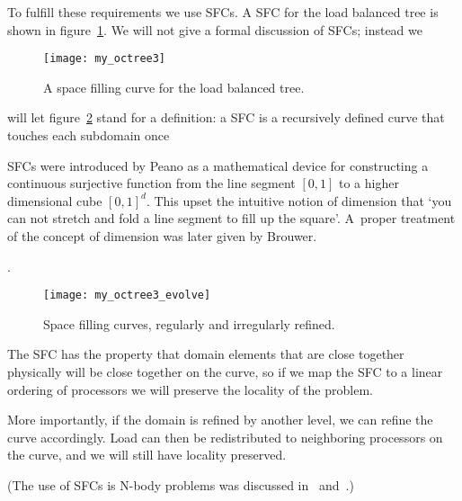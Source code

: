 To fulfill these requirements we use \acfp{SFC}. A \acf{SFC} for the
load balanced tree is shown in figure~\ref{fig:octree-sfc}. We will
not give a formal discussion of \acp{SFC}; instead we
\begin{figure}[ht]
  \texttt{[image: my\_octree3]}
  \caption{A space filling curve for the load balanced tree.}
  \label{fig:octree-sfc}
\end{figure}
will let figure~\ref{fig:octree3} stand for a definition: a \ac{SFC} is a
recursively defined curve that touches each subdomain
once
\begin{footnoteenv}
  {\acfp{SFC} were introduced by Peano as a mathematical
  device for constructing a continuous surjective function from the
  line segment $[0,1]$ to a higher dimensional cube $[0,1]^d$. This
  upset the intuitive notion of dimension that `you can not stretch
  and fold a line segment to fill up the square'. A~proper treatment
  of the concept of dimension was later given by Brouwer.}
\end{footnoteenv}
.
\begin{figure}[ht]
  \texttt{[image: my\_octree3\_evolve]}
  \caption{Space filling curves, regularly and irregularly refined.}
  \label{fig:octree3}
\end{figure}
The \ac{SFC} has the property that domain elements that are close
together physically will be close together on the curve, so if we map
the \ac{SFC} to a linear ordering of processors we will preserve the
locality of the problem. 

More importantly, if the domain is refined by
another level, we can refine the curve accordingly. Load can then be
redistributed to neighboring processors on the curve, and we will
still have locality preserved.

(The use of \acfp{SFC} is N-body problems was
discussed in~\cite{Warren:1993:hash-octree} and~\cite{Springel:gadget}.)



